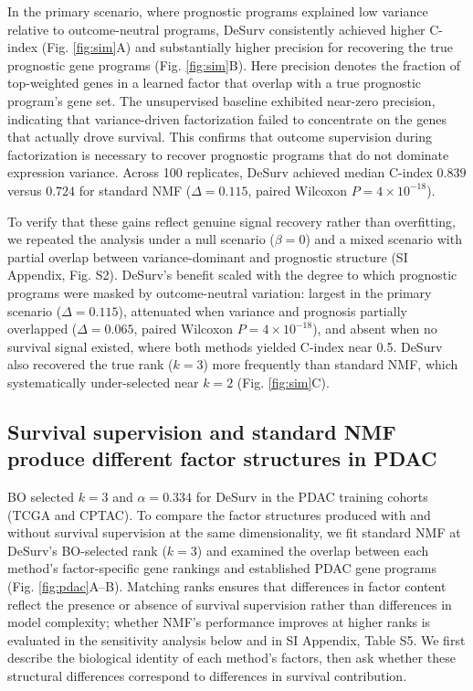 \documentclass[9pt,twocolumn,twoside,]{pnas-new}
\begin{document}
In the primary scenario, where prognostic programs explained low
variance relative to outcome-neutral programs, DeSurv consistently
achieved higher C-index (Fig. \ref{fig:sim}A) and substantially higher
precision for recovering the true prognostic gene programs (Fig.
\ref{fig:sim}B). Here precision denotes the fraction of top-weighted
genes in a learned factor that overlap with a true prognostic program's
gene set. The unsupervised baseline exhibited near-zero precision,
indicating that variance-driven factorization failed to concentrate on
the genes that actually drove survival. This confirms that outcome
supervision during factorization is necessary to recover prognostic
programs that do not dominate expression variance. Across 100
replicates, DeSurv achieved median C-index \(0.839\) versus \(0.724\)
for standard NMF (\(\Delta = 0.115\), paired Wilcoxon
\(P = \ensuremath{4\times 10^{-18}}\)).

To verify that these gains reflect genuine signal recovery rather than
overfitting, we repeated the analysis under a null scenario
(\(\beta = 0\)) and a mixed scenario with partial overlap between
variance-dominant and prognostic structure (SI Appendix, Fig. S2).
DeSurv's benefit scaled with the degree to which prognostic programs
were masked by outcome-neutral variation: largest in the primary
scenario (\(\Delta = 0.115\)), attenuated when variance and prognosis
partially overlapped (\(\Delta = 0.065\), paired Wilcoxon
\(P = \ensuremath{4\times 10^{-18}}\)), and absent when no survival
signal existed, where both methods yielded C-index near 0.5. DeSurv also
recovered the true rank (\(k = 3\)) more frequently than standard NMF,
which systematically under-selected near \(k = 2\) (Fig.
\ref{fig:sim}C).

\subsection*{Survival supervision and standard NMF produce different
factor structures in
PDAC}\label{survival-supervision-and-standard-nmf-produce-different-factor-structures-in-pdac}

BO selected \(k = 3\) and \(\alpha = 0.334\) for DeSurv in the PDAC
training cohorts (TCGA and CPTAC). To compare the factor structures
produced with and without survival supervision at the same
dimensionality, we fit standard NMF at DeSurv's BO-selected rank
(\(k = 3\)) and examined the overlap between each method's
factor-specific gene rankings and established PDAC gene programs (Fig.
\ref{fig:pdac}A--B). Matching ranks ensures that differences in factor
content reflect the presence or absence of survival supervision rather
than differences in model complexity; whether NMF's performance improves
at higher ranks is evaluated in the sensitivity analysis below and in SI
Appendix, Table S5. We first describe the biological identity of each
method's factors, then ask whether these structural differences
correspond to differences in survival contribution.
\end{document}

